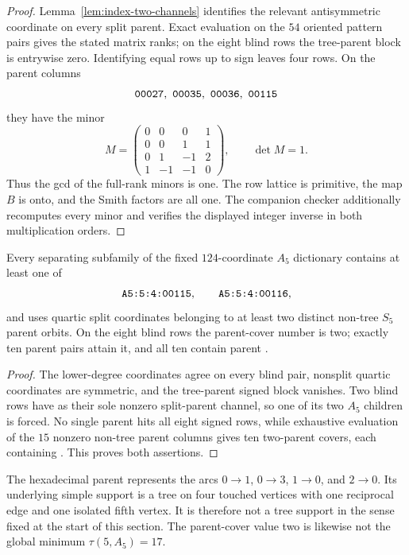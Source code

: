 \begin{proof}
Lemma~\ref{lem:index-two-channels} identifies the relevant antisymmetric
coordinate on every split parent.  Exact evaluation on the $54$ oriented
pattern pairs gives the stated matrix ranks; on the eight blind rows the
tree-parent block is entrywise zero.  Identifying equal rows up to sign leaves
four rows.  On the parent columns
\[
  \coord{00027},\ \coord{00035},\ \coord{00036},\ \coord{00115}
\]
they have the minor
\[
M=\begin{pmatrix}
0&0&0&1\\
0&0&1&1\\
0&1&-1&2\\
1&-1&-1&0
\end{pmatrix},\qquad \det M=1.
\]
Thus the gcd of the full-rank minors is one.  The row lattice is primitive,
the map $B$ is onto, and the Smith factors are all one.  The companion
checker additionally recomputes every minor and verifies the displayed
integer inverse in both multiplication orders.
\end{proof}

\begin{corollary}
\label{cor:a5-forced-child}
Every separating subfamily of the fixed $124$-coordinate $A_5$ dictionary
contains at least one of
\[
  \texttt{A5:5:4:00115},\qquad \texttt{A5:5:4:00116},
\]
and uses quartic split coordinates belonging to at least two distinct
non-tree $S_5$ parent orbits.  On the eight blind rows the parent-cover number
is two; exactly ten parent pairs attain it, and all ten contain parent
.
\end{corollary}

\begin{proof}
The lower-degree coordinates agree on every blind pair, nonsplit quartic
coordinates are symmetric, and the tree-parent signed block vanishes.  Two
blind rows have  as their sole nonzero split-parent channel, so
one of its two $A_5$ children is forced.  No single parent hits all eight
signed rows, while exhaustive evaluation of the $15$ nonzero non-tree parent
columns gives ten two-parent covers, each containing .  This
proves both assertions.
\end{proof}

The hexadecimal parent  represents the arcs
$0\mathbin{\to}1$, $0\mathbin{\to}3$, $1\mathbin{\to}0$, and
$2\mathbin{\to}0$.  Its underlying simple support is a tree on four touched
vertices with one reciprocal edge and one isolated fifth vertex.  It is
therefore not a tree support in the sense fixed at the start of this section.
The parent-cover value two is likewise not the global minimum
$\tau(5,A_5)=17$.

